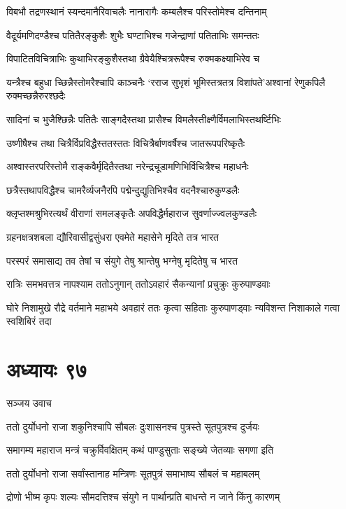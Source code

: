 \twolineshloka
{विबभौ तद्रणस्थानं स्यन्दमानैरिवाचलैः}
{नानारागैः कम्बलैश्च परिस्तोमेश्च दन्तिनाम्}


\twolineshloka
{वैदूर्यमणिदण्डैश्च पतितैरङ्कुशैः शुभैः}
{घण्टाभिश्च गजेन्द्राणां पतिताभिः समन्ततः}


\twolineshloka
{विपाटितविचित्राभिः कुथाभिरङ्कुशैस्तथा}
{ग्रैवेयैश्चित्ररूपैश्च रुक्मकक्ष्याभिरेव च}


\twolineshloka
{यन्त्रैश्च बहुधा च्छिन्नैस्तोमरैश्चापि काञ्चनैः}
{`रराज सुभृशं भूमिस्तत्रतत्र विशांपते'अश्वानां रेणुकपिलै रुक्मच्छन्नैरुरश्छदैः}


\twolineshloka
{सादिनां च भुजैश्छिन्नैः पतितैः साङ्गदैस्तथा}
{प्रासैश्च विमलैस्तीक्ष्णैर्विमलाभिस्तथर्ष्टिभिः}


\twolineshloka
{उष्णीषैश्च तथा चित्रैर्विप्रविद्धैस्ततस्ततः}
{विचित्रैर्बाणवर्षैश्च जातरूपपरिष्कृतैः}


\twolineshloka
{अश्वास्तरपरिस्तोमै राङ्कवैर्मृदितैस्तथा}
{नरेन्द्रचूडामणिभिर्विचित्रैश्च महाधनैः}


\twolineshloka
{छत्रैस्तथापविद्धैश्च चामरैर्व्यजनैरपि}
{पद्मेन्दुद्युतिभिश्चैव वदनैश्चारुकुण्डलैः}


\twolineshloka
{क्लृप्तश्मश्रुभिरत्यर्थं वीराणां समलङ्कृतैः}
{अपविद्धैर्महाराज सुवर्णाज्ज्वलकुण्डलैः}


\twolineshloka
{ग्रहनक्षत्रशबला द्यौरिवासीद्वसुंधरा}
{एवमेते महासेने मृदिते तत्र भारत}


\twolineshloka
{परस्परं समासाद्य तव तेषां च संयुगे}
{तेषु श्रान्तेषु भग्नेषु मृदितेषु च भारत}


\twolineshloka
{रात्रिः समभवत्तत्र नापश्याम ततोऽनुगान्}
{ततोऽवहारं सैकन्यानां प्रचुक्रुः कुरुपाण्डवाः}


\threelineshloka
{घोरे निशामुखे रौद्रे वर्तमाने महाभये}
{अवहारं ततः कृत्वा सहिताः कुरुपाणड्वाः}
{न्यविशन्त निशाकाले गत्वा स्वशिबिरं तदा}


\chapter{अध्यायः ९७}
\twolineshloka
{सञ्जय उवाच}
{}


\twolineshloka
{ततो दुर्योधनो राजा शकुनिश्चापि सौबलः}
{दुःशासनश्च पुत्रस्ते सूतपुत्रश्च दुर्जयः}


\twolineshloka
{समागम्य महाराज मन्त्रं चक्रुर्विवक्षितम्}
{कथं पाण्डुसुताः सङ्ख्ये जेतव्याः सगणा इति}


\twolineshloka
{ततो दुर्योधनो राजा सर्वांस्तानाह मन्त्रिणः}
{सूतपुत्रं समाभाष्य सौबलं च महाबलम्}


\twolineshloka
{द्रोणो भीष्म कृपः शल्यः सौमदत्तिश्च संयुगे}
{न पार्थान्प्रति बाधन्ते न जाने किंनु कारणम्}


